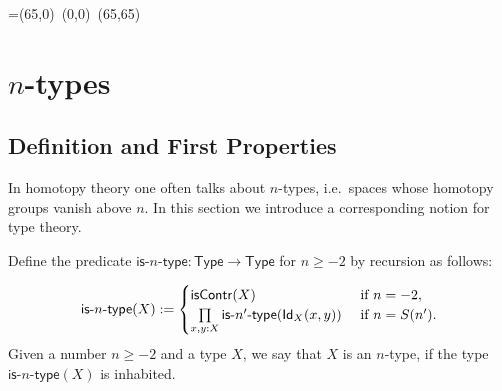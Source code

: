 \newbox\pbbox
\setbox\pbbox=\hbox{\xy \POS(65,0)\ar@{-} (0,0) \ar@{-} (65,65)\endxy}
\def\pb{\save[]+<3.5mm,-3.5mm>*{\copy\pbbox} \restore}


\newcommand{\comp}[2]{\ensuremath{{#2} \circ {#1}}}

%
\newcommand{\contr}{\ensuremath{\mathsf{contr}}}
 \newcommand{\HLevel}{\mathsf{HLevel}}
 \newcommand{\isofhlevel}{\mathsf{isofhlevel}}
 \newcommand{\istype}[1]{\mathsf{is}\mbox{-}{#1}\mbox{-}\mathsf{type}}
 \newcommand{\Type}{\mathsf{Type}}



\chapter{$n$-types}
\label{cha:hlevels}

\section{Definition and First Properties}

In homotopy theory one often talks about $n$-types, i.e.\ spaces whose homotopy groups vanish above $n$. In this section we introduce a corresponding notion for type theory. 

\begin{defn}\label{def:hlevel}
  Define the predicate $\istype{n} : \Type \to \Type$ for $n \geq -2$ by recursion as follows:

\[ \istype{n}(X) := \begin{cases}
                         \iscontr(X) & \text{ if } n = -2 , \\
                         \prod\limits_{x,y : X}\istype{n'}(\idtype[X]{x}{y}) & \text{ if } n = S(n') .
                        \end{cases}
\]
%
Given a number $n \geq -2$ and a type $X$, we say that $X$ is an $n$-type, if the type $\istype{n}(X)$ is inhabited.
\end{defn}

